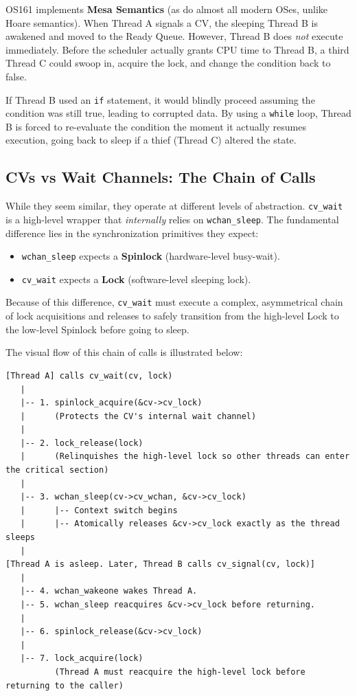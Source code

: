 OS161 implements \textbf{Mesa Semantics} (as do almost all modern OSes, unlike Hoare semantics). When Thread A signals a CV, the sleeping Thread B is awakened and moved to the Ready Queue. However, Thread B does \textit{not} execute immediately. Before the scheduler actually grants CPU time to Thread B, a third Thread C could swoop in, acquire the lock, and change the condition back to false. 

If Thread B used an \texttt{if} statement, it would blindly proceed assuming the condition was still true, leading to corrupted data. By using a \texttt{while} loop, Thread B is forced to re-evaluate the condition the moment it actually resumes execution, going back to sleep if a thief (Thread C) altered the state.

\subsection{CVs vs Wait Channels: The Chain of Calls}
While they seem similar, they operate at different levels of abstraction. \texttt{cv\_wait} is a high-level wrapper that \textit{internally} relies on \texttt{wchan\_sleep}. The fundamental difference lies in the synchronization primitives they expect:
\begin{itemize}
    \item \texttt{wchan\_sleep} expects a \textbf{Spinlock} (hardware-level busy-wait).
    \item \texttt{cv\_wait} expects a \textbf{Lock} (software-level sleeping lock). 
\end{itemize}

Because of this difference, \texttt{cv\_wait} must execute a complex, asymmetrical chain of lock acquisitions and releases to safely transition from the high-level Lock to the low-level Spinlock before going to sleep. 

The visual flow of this chain of calls is illustrated below:

\begin{verbatim}
[Thread A] calls cv_wait(cv, lock)
   |
   |-- 1. spinlock_acquire(&cv->cv_lock) 
   |      (Protects the CV's internal wait channel)
   |
   |-- 2. lock_release(lock) 
   |      (Relinquishes the high-level lock so other threads can enter the critical section)
   |
   |-- 3. wchan_sleep(cv->cv_wchan, &cv->cv_lock)
   |      |-- Context switch begins
   |      |-- Atomically releases &cv->cv_lock exactly as the thread sleeps
   |
[Thread A is asleep. Later, Thread B calls cv_signal(cv, lock)]
   |
   |-- 4. wchan_wakeone wakes Thread A.
   |-- 5. wchan_sleep reacquires &cv->cv_lock before returning.
   |
   |-- 6. spinlock_release(&cv->cv_lock)
   |
   |-- 7. lock_acquire(lock)
          (Thread A must reacquire the high-level lock before returning to the caller)
\end{verbatim}

